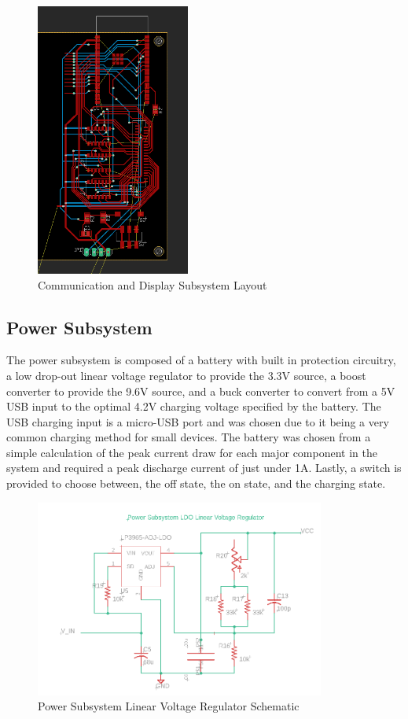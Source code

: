 \documentclass[12pt]{article}
\begin{document}
\begin{figure}[!h]
	\centering
	\includegraphics[width=0.45\textwidth]{layout.png}
	\caption{Communication and Display Subsystem Layout}
	\label{fig:layout}
\end{figure}

\subsection{Power Subsystem}

The power subsystem is composed of a battery with built in protection circuitry, a low drop-out linear voltage regulator to provide the 3.3V source, a boost converter to provide the 9.6V source, and a buck converter to convert from a 5V USB input to the optimal 4.2V charging voltage specified by the battery. The USB charging input is a micro-USB port and was chosen due to it being a very common charging method for small devices. The battery was chosen from a simple calculation of the peak current draw for each major component in the system and required a peak discharge current of just under 1A. Lastly, a switch is provided to choose between, the off state, the on state, and the charging state.

\begin{figure}[!h]
	\centering
	\includegraphics[width=0.85\textwidth]{ldo_schem.png}
	\caption{Power Subsystem Linear Voltage Regulator Schematic}
	\label{fig:ldo_schem}
\end{figure}
\end{document}
